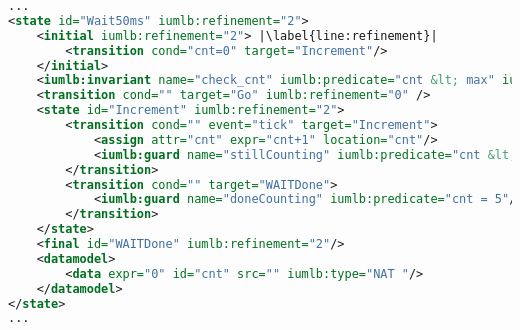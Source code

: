 \begin{lstlisting}[caption={\textbf{Wait50ms} state snippet of \SCXML model representation illustrating the use of different \SCXML modeling features, as well as, added syntax extensions},label={lst:secBot}, language=xml, escapechar=|, frame=single, float=t]
...
<state id="Wait50ms" iumlb:refinement="2">
	<initial iumlb:refinement="2"> |\label{line:refinement}|
		<transition cond="cnt=0" target="Increment"/> 
	</initial>
	<iumlb:invariant name="check_cnt" iumlb:predicate="cnt &lt; max" iumlb:refinement="2"/> |\label{line:invariant}|
	<transition cond="" target="Go" iumlb:refinement="0" />
	<state id="Increment" iumlb:refinement="2">
		<transition cond="" event="tick" target="Increment">
			<assign attr="cnt" expr="cnt+1" location="cnt"/>
			<iumlb:guard name="stillCounting" iumlb:predicate="cnt &lt; 5"/> |\label{line:predicate}|
		</transition>
		<transition cond="" target="WAITDone">
			<iumlb:guard name="doneCounting" iumlb:predicate="cnt = 5"/> |\label{line:guard}|
    	</transition>
	</state>
	<final id="WAITDone" iumlb:refinement="2"/>
	<datamodel>
		<data expr="0" id="cnt" src="" iumlb:type="NAT "/>
	</datamodel>
</state>
...
\end{lstlisting}



